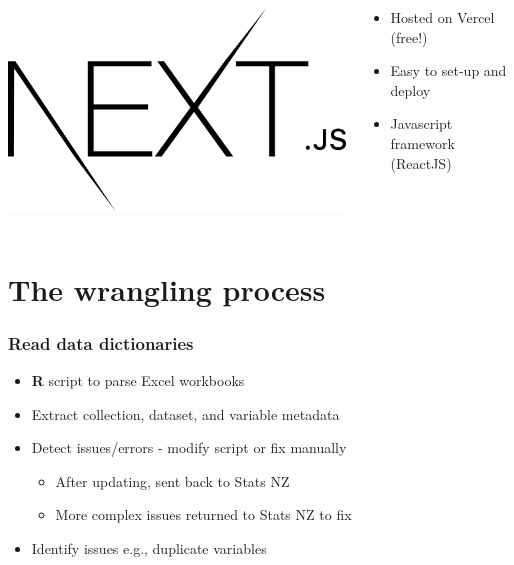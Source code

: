 \documentclass{beamer}
\newcommand{\prog}[1]{\textsf{\bfseries #1}}
\begin{document}
\begin{frame}
    \begin{columns}
        \begin{column}{0.4\textwidth}
            \centering
            \includegraphics[width=0.7\linewidth]{nextjs.png}
        \end{column}
        \begin{column}{0.6\textwidth}
            \begin{itemize}
                \item Hosted on Vercel (free!)
                \item Easy to set-up and deploy
                \item Javascript framework (ReactJS)
            \end{itemize}
        \end{column}
    \end{columns}
\end{frame}

\section{The wrangling process}

\begin{frame}
    \frametitle{Read data dictionaries}

    \begin{itemize}
        \item \prog{R} script to parse Excel workbooks
        \item Extract collection, dataset, and variable metadata
        \item Detect issues/errors - modify script or fix manually
        \begin{itemize}
            \item After updating, sent back to Stats NZ
            \item More complex issues returned to Stats NZ to fix
        \end{itemize}
        \item Identify issues e.g., duplicate variables
    \end{itemize}
\end{frame}
\end{document}
